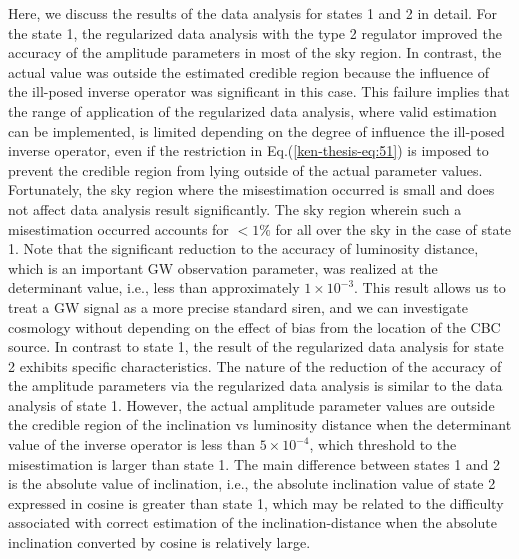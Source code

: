 \documentclass[%
 aps,
 prd,
 amsmath,amssymb,
 reprint,%
superscriptaddress
]{revtex4-1}
\begin{document}
Here, we discuss the results of the data analysis for states 1 and 2 in detail. For the state 1, the regularized data analysis with the type 2 regulator improved the accuracy of the amplitude parameters in most of the sky region. In contrast, the actual value was outside the estimated credible region because the influence of the ill-posed inverse operator was significant in this case. This failure implies that the range of application of the regularized data analysis, where valid estimation can be implemented, is limited depending on the degree of influence the ill-posed inverse operator, even if the restriction in Eq.(\ref{ken-thesis-eq:51}) is imposed to prevent the credible region from lying outside of the actual parameter values. Fortunately, the sky region where the misestimation occurred is small and does not affect data analysis result significantly. The sky region wherein such a misestimation occurred accounts for
$<1\%$ for all over the sky in the case of state 1. Note that the significant reduction to the accuracy of luminosity distance, which is an important GW observation parameter, was realized at the determinant value, i.e., less than approximately $1\times10^{-3}$. This result allows us to treat a GW signal as a more precise standard siren\cite{schutz-nature}, and we can investigate cosmology without depending on the effect of bias from the location of the CBC source. In contrast to state 1, the result of the regularized data analysis for state 2 exhibits specific characteristics. The nature of the reduction of the accuracy of the amplitude parameters via the regularized data analysis is similar to the data analysis of state 1. However, the actual amplitude parameter values are outside the credible region of the inclination vs luminosity distance when the determinant value of the inverse operator is less than $5\times10^{-4}$, which threshold to the misestimation is larger than state 1. The main difference between states 1 and 2 is the absolute value of inclination, i.e., the absolute inclination value of state 2 expressed in cosine is greater than state 1, which may be related to the difficulty associated with correct estimation of the inclination-distance when the absolute inclination converted by cosine is relatively large.
\end{document}
